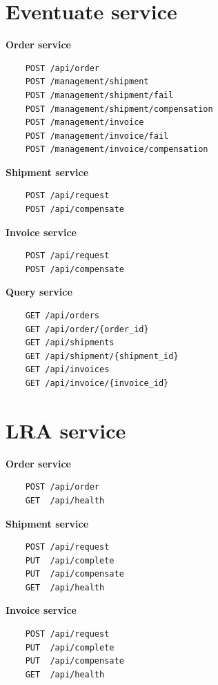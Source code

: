 \documentclass[oneside,
  digital, %
  table,   %
  nolof,     %
  nolot,     %
]{fithesis3}
\begin{document}
\section{Eventuate service}

\textbf{Order service}

\begin{verbatim}
    POST /api/order
    POST /management/shipment
    POST /management/shipment/fail
    POST /management/shipment/compensation
    POST /management/invoice
    POST /management/invoice/fail
    POST /management/invoice/compensation
\end{verbatim}

\noindent
\textbf{Shipment service}

\begin{verbatim}
    POST /api/request
    POST /api/compensate
\end{verbatim}

\noindent
\textbf{Invoice service}

\begin{verbatim}
    POST /api/request
    POST /api/compensate
\end{verbatim}

\noindent
\textbf{Query service}

\begin{verbatim}
    GET /api/orders
    GET /api/order/{order_id}
    GET /api/shipments
    GET /api/shipment/{shipment_id}
    GET /api/invoices
    GET /api/invoice/{invoice_id}
\end{verbatim}

\section{LRA service}

\textbf{Order service}

\begin{verbatim}
    POST /api/order
    GET  /api/health
\end{verbatim}

\noindent
\textbf{Shipment service}

\begin{verbatim}
    POST /api/request
    PUT  /api/complete
    PUT  /api/compensate
    GET  /api/health
\end{verbatim}

\noindent
\textbf{Invoice service}

\begin{verbatim}
    POST /api/request
    PUT  /api/complete
    PUT  /api/compensate
    GET  /api/health
\end{verbatim}
\end{document}
